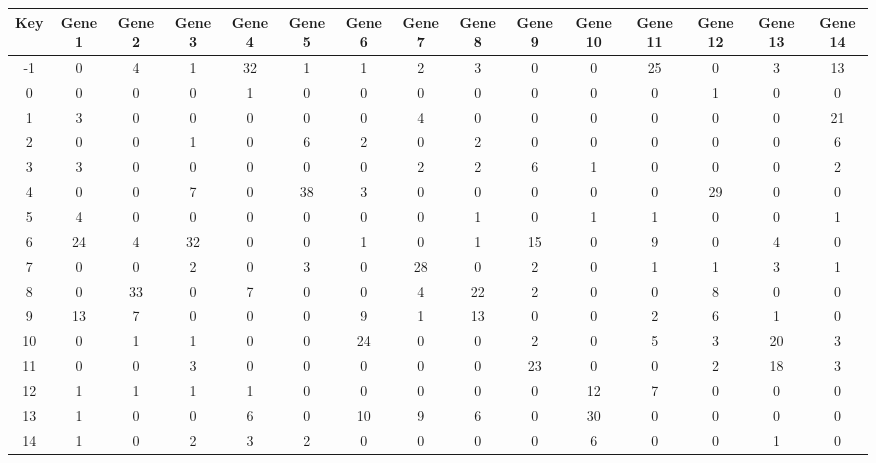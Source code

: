 \begin{tabular}{|c|c|c|c|c|c|c|c|c|c|c|c|c|c|c|}
\hline
Key & Gene 1 & Gene 2 & Gene 3 & Gene 4 & Gene 5 & Gene 6 & Gene 7 & Gene 8 & Gene 9 & Gene 10 & Gene 11 & Gene 12 & Gene 13 & Gene 14 \\
\hline
-1 & 0 & 4 & 1 & 32 & 1 & 1 & 2 & 3 & 0 & 0 & 25 & 0 & 3 & 13 \\
0 & 0 & 0 & 0 & 1 & 0 & 0 & 0 & 0 & 0 & 0 & 0 & 1 & 0 & 0 \\
1 & 3 & 0 & 0 & 0 & 0 & 0 & 4 & 0 & 0 & 0 & 0 & 0 & 0 & 21 \\
2 & 0 & 0 & 1 & 0 & 6 & 2 & 0 & 2 & 0 & 0 & 0 & 0 & 0 & 6 \\
3 & 3 & 0 & 0 & 0 & 0 & 0 & 2 & 2 & 6 & 1 & 0 & 0 & 0 & 2 \\
4 & 0 & 0 & 7 & 0 & 38 & 3 & 0 & 0 & 0 & 0 & 0 & 29 & 0 & 0 \\
5 & 4 & 0 & 0 & 0 & 0 & 0 & 0 & 1 & 0 & 1 & 1 & 0 & 0 & 1 \\
6 & 24 & 4 & 32 & 0 & 0 & 1 & 0 & 1 & 15 & 0 & 9 & 0 & 4 & 0 \\
7 & 0 & 0 & 2 & 0 & 3 & 0 & 28 & 0 & 2 & 0 & 1 & 1 & 3 & 1 \\
8 & 0 & 33 & 0 & 7 & 0 & 0 & 4 & 22 & 2 & 0 & 0 & 8 & 0 & 0 \\
9 & 13 & 7 & 0 & 0 & 0 & 9 & 1 & 13 & 0 & 0 & 2 & 6 & 1 & 0 \\
10 & 0 & 1 & 1 & 0 & 0 & 24 & 0 & 0 & 2 & 0 & 5 & 3 & 20 & 3 \\
11 & 0 & 0 & 3 & 0 & 0 & 0 & 0 & 0 & 23 & 0 & 0 & 2 & 18 & 3 \\
12 & 1 & 1 & 1 & 1 & 0 & 0 & 0 & 0 & 0 & 12 & 7 & 0 & 0 & 0 \\
13 & 1 & 0 & 0 & 6 & 0 & 10 & 9 & 6 & 0 & 30 & 0 & 0 & 0 & 0 \\
14 & 1 & 0 & 2 & 3 & 2 & 0 & 0 & 0 & 0 & 6 & 0 & 0 & 1 & 0 \\
\hline
\end{tabular}